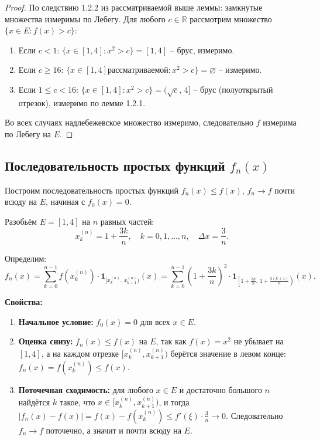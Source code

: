 \documentclass[12pt,a4paper]{article}
\theoremstyle{definition}
\newcommand{\R}{\mathbb{R}}
\begin{document}
\begin{proof}
    По следствию 1.2.2 из рассматриваемой выше леммы: замкнутые множества измеримы по Лебегу.
    Для любого $c \in \R$ рассмотрим множество $\{x \in E : f(x) > c\}$:

    \begin{enumerate}
        \item Если $c < 1$: $\{x \in [1,4] : x^2 > c\} = [1,4]$ -- брус, измеримо.
        \item Если $c \geq 16$: $\{x \in [1,4] рассматриваемой: x^2 > c\} = \varnothing$ -- измеримо.
        \item Если $1 \leq c < 16$: $\{x \in [1,4] : x^2 > c\} = (\sqrt{c},\, 4]$ --
              брус (полуоткрытый отрезок), измеримо по лемме 1.2.1.
    \end{enumerate}

    Во всех случаях надлебежевское множество измеримо, следовательно $f$ измерима по Лебегу на $E$.
\end{proof}

\subsection{Последовательность простых функций $f_n(x)$}

Построим последовательность простых функций $f_n(x) \leq f(x)$, $f_n \to f$ почти всюду на $E$,
начиная с $f_0(x) = 0$.

Разобьём $E = [1,4]$ на $n$ равных частей:
\[
    x_k^{(n)} = 1 + \frac{3k}{n}, \quad k = 0, 1, \ldots, n,
    \quad \Delta x = \frac{3}{n}.
\]

Определим:
\[
    f_n(x) = \sum_{k=0}^{n-1} f\!\left(x_k^{(n)}\right) \cdot \mathbf{1}_{[x_k^{(n)},\, x_{k+1}^{(n)})}(x)
    = \sum_{k=0}^{n-1} \left(1 + \frac{3k}{n}\right)^2
      \cdot \mathbf{1}_{\left[1+\frac{3k}{n},\, 1+\frac{3(k+1)}{n}\right)}(x).
\]

\textbf{Свойства:}
\begin{enumerate}
    \item \textbf{Начальное условие:} $f_0(x) = 0$ для всех $x \in E$.
    \item \textbf{Оценка снизу:} $f_n(x) \leq f(x)$ на $E$, так как $f(x) = x^2$ не убывает
          на $[1,4]$, а на каждом отрезке $[x_k^{(n)}, x_{k+1}^{(n)})$ берётся значение в
          левом конце: $f_n(x) = f(x_k^{(n)}) \leq f(x)$.
    \item \textbf{Поточечная сходимость:} для любого $x \in E$ и достаточно большого $n$
          найдётся $k$ такое, что $x \in [x_k^{(n)}, x_{k+1}^{(n)})$, и тогда
          $|f_n(x) - f(x)| = f(x) - f(x_k^{(n)}) \leq f'(\xi)\cdot\frac{3}{n} \to 0$.
          Следовательно $f_n \to f$ поточечно, а значит и почти всюду на $E$.
\end{enumerate}
\end{document}
